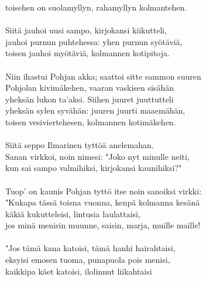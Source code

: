 toisehen on suolamyllyn, rahamyllyn kolmantehen.                  \\
                                                                  \\
Siitä jauhoi uusi sampo, kirjokansi kiikutteli,                   \\
jauhoi purnun puhtehessa: yhen purnun syötäviä,                   \\
toisen jauhoi myötäviä, kolmannen kotipitoja.                     \\
                                                                  \\
Niin ihastui Pohjan akka; saattoi sitte sammon suuren             \\
Pohjolan kivimäkehen, vaaran vaskisen sisähän                     \\
yheksän lukon ta'aksi. Siihen juuret juuttutteli                  \\
yheksän sylen syvähän: juuren juurti maaemähän,                   \\
toisen vesiviertehesen, kolmannen kotimäkehen.                    \\
                                                                  \\
Siitä seppo Ilmarinen tyttöä anelemahan.                          \\
Sanan virkkoi, noin nimesi: "Joko nyt minulle neiti,              \\
kun sai sampo valmihiksi, kirjokansi kaunihiksi?"                 \\
                                                                  \\
Tuop' on kaunis Pohjan tyttö itse noin sanoiksi virkki:           \\
"Kukapa tässä toisna vuonna, kenpä kolmanna kesänä                \\
käkiä kukutteleisi, lintusia laulattaisi,                         \\
jos minä menisin muunne, saisin, marja, muille maille!            \\
                                                                  \\
"Jos tämä kana katoisi, tämä hanhi hairahtaisi,                   \\
eksyisi emosen tuoma, punapuola pois menisi,                      \\
kaikkipa käet katoisi, ilolinnut liikahtaisi                      \\
